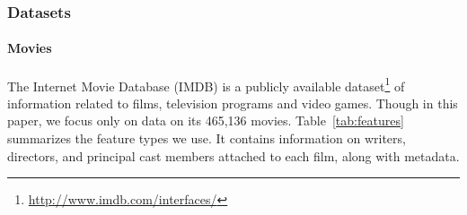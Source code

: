 \documentclass{article} %
\begin{document}


\subsubsection{Datasets}

\paragraph{Movies}
The Internet Movie Database (IMDB) is a publicly available dataset\footnote{\href{http://www.imdb.com/interfaces/}{http://www.imdb.com/interfaces/}} of information related to films, television programs and video games.
Though in this paper, we focus only on data on its 465,136 movies.
Table~\ref{tab:features} summarizes the feature types we use.
It contains information on writers, directors, and principal cast members attached to each film, along with  metadata.
\end{document}
